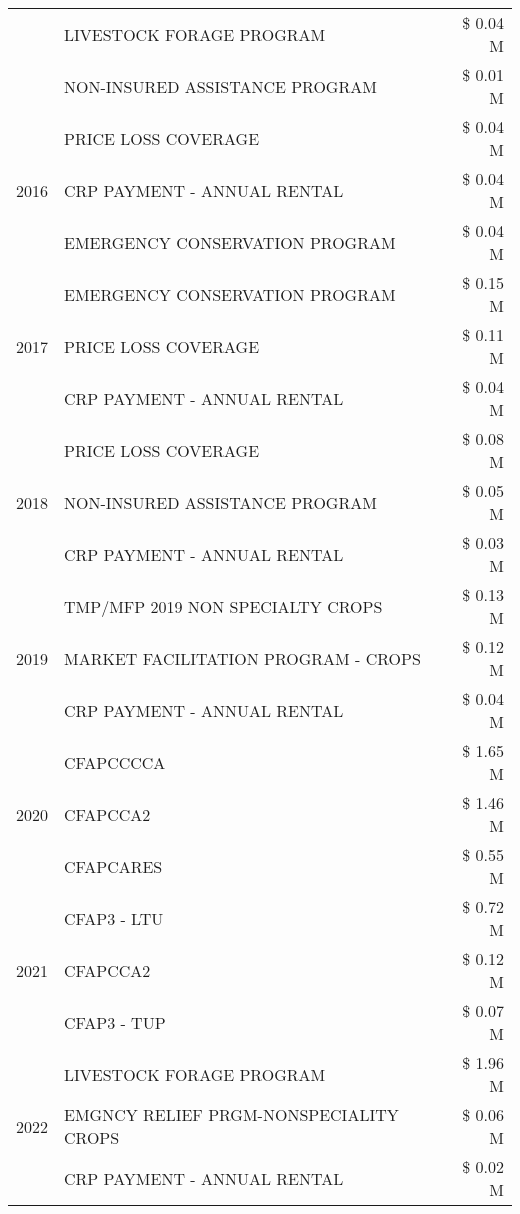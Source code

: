 \begin{tabular}{llr}
 & LIVESTOCK FORAGE PROGRAM & \$ 0.04 M \\
 & NON-INSURED ASSISTANCE PROGRAM & \$ 0.01 M \\
\cline{1-3}
\multirow[t]{3}{*}{2016} & PRICE LOSS COVERAGE & \$ 0.04 M \\
 & CRP PAYMENT - ANNUAL RENTAL & \$ 0.04 M \\
 & EMERGENCY CONSERVATION PROGRAM & \$ 0.04 M \\
\cline{1-3}
\multirow[t]{3}{*}{2017} & EMERGENCY CONSERVATION PROGRAM & \$ 0.15 M \\
 & PRICE LOSS COVERAGE & \$ 0.11 M \\
 & CRP PAYMENT - ANNUAL RENTAL & \$ 0.04 M \\
\cline{1-3}
\multirow[t]{3}{*}{2018} & PRICE LOSS COVERAGE & \$ 0.08 M \\
 & NON-INSURED ASSISTANCE PROGRAM & \$ 0.05 M \\
 & CRP PAYMENT - ANNUAL RENTAL & \$ 0.03 M \\
\cline{1-3}
\multirow[t]{3}{*}{2019} & TMP/MFP 2019 NON SPECIALTY CROPS & \$ 0.13 M \\
 & MARKET FACILITATION PROGRAM - CROPS & \$ 0.12 M \\
 & CRP PAYMENT - ANNUAL RENTAL & \$ 0.04 M \\
\cline{1-3}
\multirow[t]{3}{*}{2020} & CFAPCCCCA & \$ 1.65 M \\
 & CFAPCCA2 & \$ 1.46 M \\
 & CFAPCARES & \$ 0.55 M \\
\cline{1-3}
\multirow[t]{3}{*}{2021} & CFAP3 - LTU & \$ 0.72 M \\
 & CFAPCCA2 & \$ 0.12 M \\
 & CFAP3 - TUP & \$ 0.07 M \\
\cline{1-3}
\multirow[t]{3}{*}{2022} & LIVESTOCK FORAGE PROGRAM & \$ 1.96 M \\
 & EMGNCY RELIEF PRGM-NONSPECIALITY CROPS & \$ 0.06 M \\
 & CRP PAYMENT - ANNUAL RENTAL & \$ 0.02 M \\
\cline{1-3}
\bottomrule
\end{tabular}
